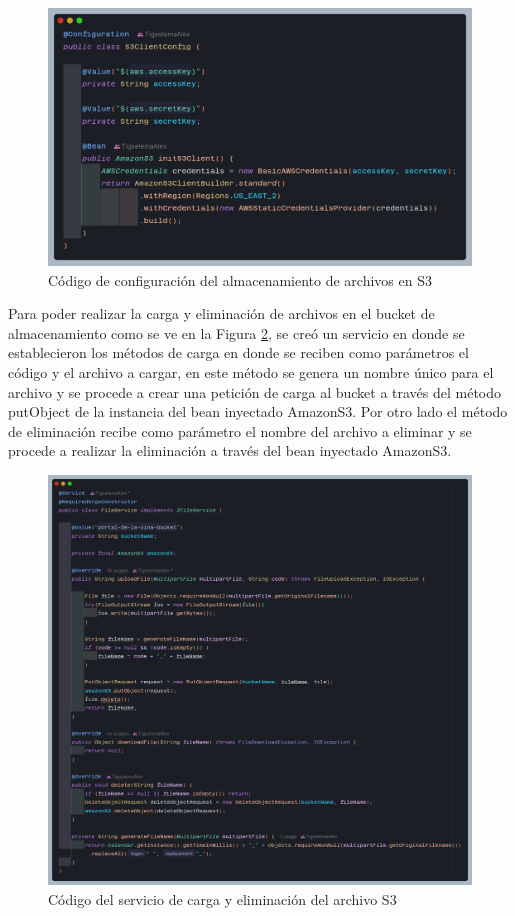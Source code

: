 \begin{figure}[H]
    \centering
    \includegraphics[width=1\textwidth]{resources/images/s3}
    \caption{Código de configuración del almacenamiento de archivos en S3}
    \label{fig:s3-config}
\end{figure}

Para poder realizar la carga y eliminación de archivos en el bucket de almacenamiento como se ve en la Figura \ref{fig:s3-fileService}, se creó un servicio en donde se establecieron los métodos de carga en donde se reciben como parámetros el código y el archivo a cargar, en este método se genera un nombre único para el archivo y se procede a crear una petición de carga al bucket a través del método putObject de la instancia del bean inyectado AmazonS3.
Por otro lado el método de eliminación recibe como parámetro el nombre del archivo a eliminar y se procede a realizar la eliminación a través del bean inyectado AmazonS3.

\begin{figure}[H]
    \centering
    \includegraphics[width=1\textwidth]{resources/images/fileService}
    \caption{Código del servicio de carga y eliminación del archivo S3}
    \label{fig:s3-fileService}
\end{figure}


